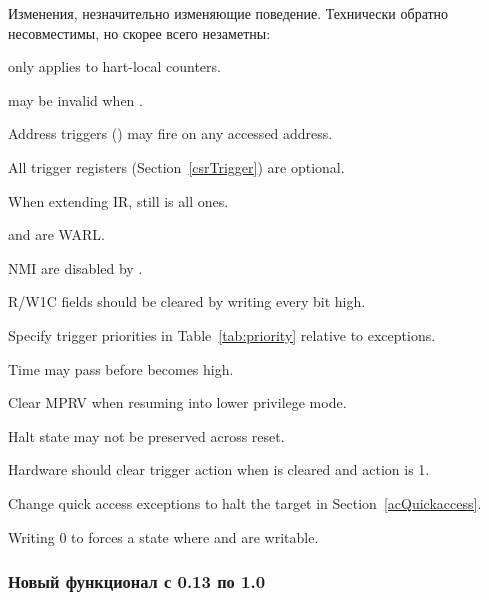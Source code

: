 \begin{steps}{Изменения, незначительно изменяющие поведение. Технически обратно
несовместимы, но скорее всего незаметны:}
    \item \FcsrDcsrStopcount only applies to hart-local counters. 
    \item \FdmDmstatusVersion may be invalid when . 
    \item Address triggers (\RcsrMcontrol) may fire on any accessed address. 
    \item All trigger registers (Section~\ref{csrTrigger}) are optional. 
    \item When extending IR, \RdtmBypass still is all ones. 
    \item \FcsrDcsrEbreaks and \FcsrDcsrEbreaku are WARL. 
    \item NMI are disabled by \FcsrDcsrStepie. 
    \item R/W1C fields should be cleared by writing every bit high. 
    \item Specify trigger priorities in Table~\ref{tab:priority} relative to exceptions. 
    \item Time may pass before \FdmDmcontrolDmactive becomes high. 
    \item Clear MPRV when resuming into lower privilege mode. 
    \item Halt state may not be preserved across reset. 
    \item Hardware should clear trigger action when \FcsrTdataOneDmode is
        cleared and action is 1. 
    \item Change quick access exceptions to halt the target in
    Section~\ref{acQuickaccess}. 
    \item Writing 0 to \RcsrTdataOne forces a state where \RcsrTdataTwo and
        \RcsrTdataThree are writable. 
\end{steps}

\subsubsection{Новый функционал с 0.13 по 1.0}


